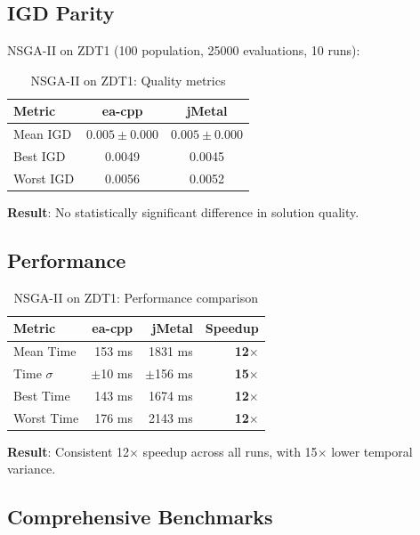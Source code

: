 \documentclass[10pt,a4paper]{article}
\begin{document}
\subsection{IGD Parity}

NSGA-II on ZDT1 (100 population, 25000 evaluations, 10 runs):

\begin{table}[h]
\centering
\caption{NSGA-II on ZDT1: Quality metrics}
\label{tab:igd}
\begin{tabular}{@{}lcc@{}}
\toprule
\textbf{Metric} & \textbf{ea-cpp} & \textbf{jMetal} \\
\midrule
Mean IGD & $0.005 \pm 0.000$ & $0.005 \pm 0.000$ \\
Best IGD & 0.0049 & 0.0045 \\
Worst IGD & 0.0056 & 0.0052 \\
\bottomrule
\end{tabular}
\end{table}

\textbf{Result}: No statistically significant difference in solution quality.

\subsection{Performance}

\begin{table}[h]
\centering
\caption{NSGA-II on ZDT1: Performance comparison}
\label{tab:perf}
\begin{tabular}{@{}lrrr@{}}
\toprule
\textbf{Metric} & \textbf{ea-cpp} & \textbf{jMetal} & \textbf{Speedup} \\
\midrule
Mean Time & 153 ms & 1831 ms & \textbf{12$\times$} \\
Time $\sigma$ & $\pm$10 ms & $\pm$156 ms & \textbf{15$\times$} \\
Best Time & 143 ms & 1674 ms & \textbf{12$\times$} \\
Worst Time & 176 ms & 2143 ms & \textbf{12$\times$} \\
\bottomrule
\end{tabular}
\end{table}

\textbf{Result}: Consistent 12$\times$ speedup across all runs, with 15$\times$ lower temporal variance.

\subsection{Comprehensive Benchmarks}
\end{document}
